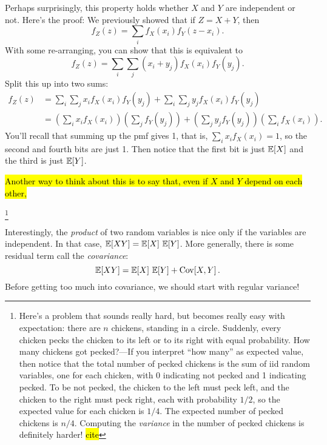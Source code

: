 Perhaps surprisingly, this property holds whether $X$ and $Y$ are independent
or not. Here's the proof: We previously showed that if $Z = X + Y$, then
\begin{equation}
f_Z(z) = \sum_i f_X(x_i) f_Y(z - x_i).
\end{equation}
With some re-arranging, you can show that this is equivalent to
\begin{equation}
f_Z(z) = \sum_i \sum_j (x_i + y_j) f_X(x_i) f_Y(y_j).
\end{equation}
Split this up into two sums:
\begin{align*}
f_Z(z) &= \sum_i \sum_j x_i f_X(x_i) f_Y(y_j) + \sum_i \sum_j y_j f_X(x_i) f_Y(y_j) \\
  &= \left(\sum_i x_i f_X(x_i)\right) \left(\sum_j f_Y(y_j)\right) +
    \left(\sum_j y_j f_Y(y_j)\right) \left(\sum_i f_X(x_i)\right).
\end{align*}
You'll recall that summing up the pmf gives 1, that is, $\sum_i x_i f_X(x_i) =
1$, so the second and fourth bits are just 1. Then notice that the first bit is
just $\mathbb{E}\!\left[{X}\right]$ and the third is just $\mathbb{E}\!\left[{Y}\right]$.

\hl{Another way to think about this is to say that, even if $X$ and $Y$ depend on
each other,}

\footnote{Here's a problem that sounds really hard, but becomes
really easy with expectation: there are $n$ chickens, standing in a circle.
Suddenly, every chicken pecks the chicken to its left or to its right with
equal probability. How many chickens got pecked?---If you interpret ``how many''
as expected value, then notice that the total number of pecked chickens is the
sum of iid random variables, one for each chicken, with 0 indicating not pecked
and 1 indicating pecked. To be not pecked, the chicken to the left must peck
left, and the chicken to the right must peck right, each with probability
$1/2$, so the expected value for each chicken is $1/4$. The
expected number of pecked chickens is $n/4$. Computing the
\emph{variance} in the number of pecked chickens is definitely harder! \hl{cite}}

Interestingly, the \emph{product} of two random variables is nice only if the
variables are independent. In that case, $\mathbb{E}\!\left[{XY}\right] = \mathbb{E}\!\left[{X}\right]\,\mathbb{E}\!\left[{Y}\right]$.
More generally, there is some residual term call the \emph{covariance}:
\begin{equation}
\mathbb{E}\!\left[{XY}\right] = \mathbb{E}\!\left[{X}\right] \, \mathbb{E}\!\left[{Y}\right] + \mathrm{Cov}\!\left[{X, Y}\right].
\end{equation}
Before getting too much into covariance, we should start with regular variance!

